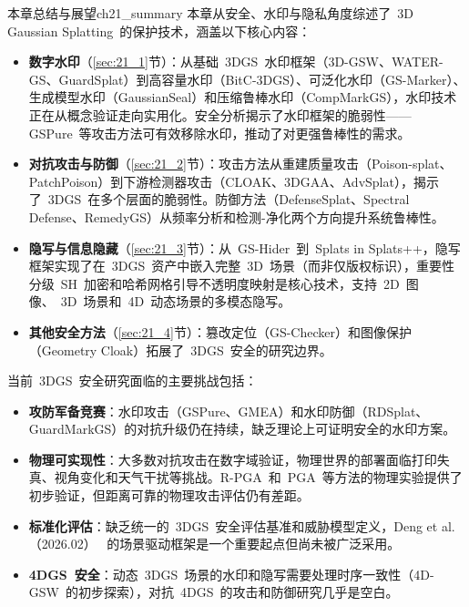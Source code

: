 \begin{futurebox}{本章总结与展望}{ch21_summary}
本章从安全、水印与隐私角度综述了~3D Gaussian Splatting~的保护技术，涵盖以下核心内容：
\begin{itemize}
\item \textbf{数字水印}（\ref{sec:21_1}节）：从基础~3DGS~水印框架（3D-GSW、WATER-GS、GuardSplat）到高容量水印（BitC-3DGS）、可泛化水印（GS-Marker）、生成模型水印（GaussianSeal）和压缩鲁棒水印（CompMarkGS），水印技术正在从概念验证走向实用化。安全分析揭示了水印框架的脆弱性——GSPure~等攻击方法可有效移除水印，推动了对更强鲁棒性的需求。
\item \textbf{对抗攻击与防御}（\ref{sec:21_2}节）：攻击方法从重建质量攻击（Poison-splat、PatchPoison）到下游检测器攻击（CLOAK、3DGAA、AdvSplat），揭示了~3DGS~在多个层面的脆弱性。防御方法（DefenseSplat、Spectral Defense、RemedyGS）从频率分析和检测-净化两个方向提升系统鲁棒性。
\item \textbf{隐写与信息隐藏}（\ref{sec:21_3}节）：从~GS-Hider~到~Splats in Splats++，隐写框架实现了在~3DGS~资产中嵌入完整~3D~场景（而非仅版权标识），重要性分级~SH~加密和哈希网格引导不透明度映射是核心技术，支持~2D~图像、~3D~场景和~4D~动态场景的多模态隐写。
\item \textbf{其他安全方法}（\ref{sec:21_4}节）：篡改定位（GS-Checker）和图像保护（Geometry Cloak）拓展了~3DGS~安全的研究边界。
\end{itemize}

当前~3DGS~安全研究面临的主要挑战包括：
\begin{itemize}
\item \textbf{攻防军备竞赛}：水印攻击（GSPure、GMEA）和水印防御（RDSplat、GuardMarkGS）的对抗升级仍在持续，缺乏理论上可证明安全的水印方案。
\item \textbf{物理可实现性}：大多数对抗攻击在数字域验证，物理世界的部署面临打印失真、视角变化和天气干扰等挑战。R-PGA~和~PGA~等方法的物理实验提供了初步验证，但距离可靠的物理攻击评估仍有差距。
\item \textbf{标准化评估}：缺乏统一的~3DGS~安全评估基准和威胁模型定义，Deng et al.（2026.02）~\cite{2602_02602} 的场景驱动框架是一个重要起点但尚未被广泛采用。
\item \textbf{4DGS~安全}：动态~3DGS~场景的水印和隐写需要处理时序一致性（4D-GSW~的初步探索），对抗~4DGS~的攻击和防御研究几乎是空白。
\end{itemize}
\end{futurebox}
